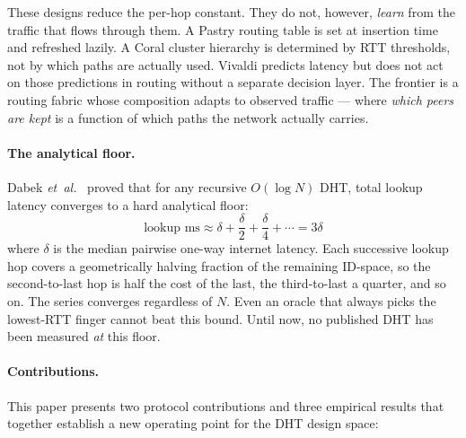 \documentclass[conference]{IEEEtran}
\begin{document}
These designs reduce the per-hop constant. They do not, however,
\emph{learn} from the traffic that flows through them. A Pastry routing
table is set at insertion time and refreshed lazily. A Coral cluster
hierarchy is determined by RTT thresholds, not by which paths are
actually used. Vivaldi predicts latency but does not act on those
predictions in routing without a separate decision layer. The frontier
is a routing fabric whose composition adapts to observed traffic ---
where \emph{which peers are kept} is a function of which paths the network
actually carries.

\paragraph{The analytical floor.} Dabek \emph{et~al.}~\cite{dabek2004designing}
proved that for any recursive $O(\log N)$ DHT, total lookup latency
converges to a hard analytical floor:
\begin{equation}
\text{lookup ms} \approx \delta + \frac{\delta}{2} + \frac{\delta}{4} + \cdots = 3\delta
\label{eq:dabek}
\end{equation}
where $\delta$ is the median pairwise one-way internet latency. Each
successive lookup hop covers a geometrically halving fraction of the
remaining ID-space, so the second-to-last hop is half the cost of the
last, the third-to-last a quarter, and so on. The series converges
regardless of $N$. Even an oracle that always picks the lowest-RTT
finger cannot beat this bound. Until now, no published DHT has been
measured \emph{at} this floor.

\paragraph{Contributions.}
This paper presents two protocol contributions and three empirical results
that together establish a new operating point for the DHT design space:
\end{document}

